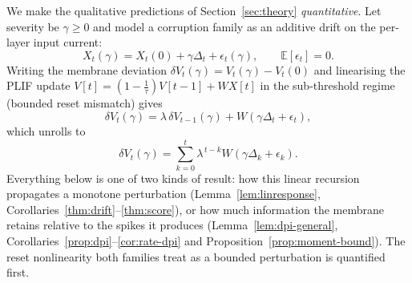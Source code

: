 ﻿\documentclass{article} %
\theoremstyle{remark}
\begin{document}
We make the qualitative predictions of Section~\ref{sec:theory} \emph{quantitative}.
Let severity be $\gamma\ge0$ and model a corruption family as an additive drift on the
per-layer input current:
\begin{equation}
  X_t(\gamma) = X_t(0) + \gamma\Delta_t + \epsilon_t(\gamma),\qquad \mathbb{E}[\epsilon_t]=0.
  \label{eq:drift-model}
\end{equation}
Writing the membrane deviation $\delta V_t(\gamma)=V_t(\gamma)-V_t(0)$ and linearising the
PLIF update $V[t]=(1-\tfrac1\tau)V[t-1]+WX[t]$ in the sub-threshold regime (bounded reset
mismatch) gives
\begin{equation}
  \delta V_t(\gamma) = \lambda\,\delta V_{t-1}(\gamma)+W\!\left(\gamma\Delta_t+\epsilon_t\right),
  \label{eq:linearized}
\end{equation}
which unrolls to
\begin{equation}
  \delta V_t(\gamma) = \sum_{k=0}^{t}\lambda^{\,t-k}W\!\left(\gamma\Delta_k+\epsilon_k\right).
  \label{eq:unroll-dev}
\end{equation}
Everything below is one of two kinds of result: how this linear recursion propagates a monotone
perturbation (Lemma~\ref{lem:linresponse}, Corollaries~\ref{thm:drift}--\ref{thm:score}), or how much
information the membrane retains relative to the spikes it produces (Lemma~\ref{lem:dpi-general},
Corollaries~\ref{prop:dpi}--\ref{cor:rate-dpi} and Proposition~\ref{prop:moment-bound}). The reset
nonlinearity both families treat as a bounded perturbation is quantified first.
\end{document}
